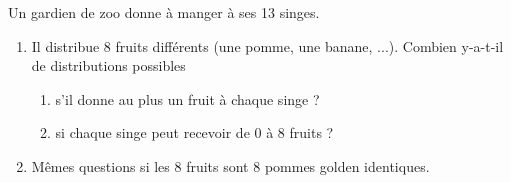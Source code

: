 \documentclass[a4paper, 11pt]{article}
\begin{document}
\begin{exercice}   \;
	Un gardien de zoo donne \`a manger \`a ses 13 singes.
	\begin{enumerate}
		\item Il distribue 8 fruits diff\'erents (une pomme, une banane, ...). Combien y-a-t-il de distributions possibles
		      \begin{enumerate}
			      \item s'il donne au plus un fruit \`a chaque singe ?
			      \item si chaque singe peut recevoir de 0 \`a 8 fruits ?
		      \end{enumerate}
		\item M\^emes questions si les 8 fruits sont 8 pommes golden identiques.
	\end{enumerate}
\end{exercice}
\end{document}
